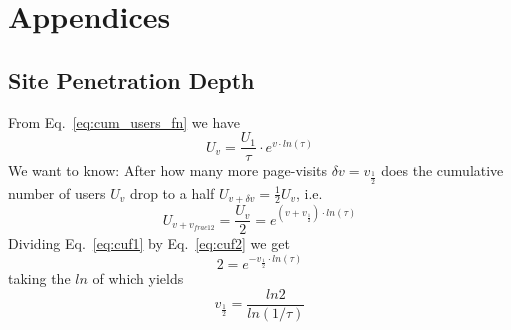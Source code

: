 \documentclass[12pt]{report}
\newcommand{\beq}{\begin{equation}} %
\newcommand{\eeq}{\end{equation}} %
\newcommand{\bdm}{\begin{displaymath}} %
\newcommand{\edm}{\end{displaymath}} %
\begin{document}
\section{Appendices}

\subsection{Site Penetration Depth}\label{sec:penetration_depth}

From Eq.~\ref{eq:cum_users_fn} we have
\beq\label{eq:cuf1}
U_v = \frac{U_1}\tau \cdot e^{v\cdot ln(\tau)}
\eeq
We want to know: After how many more page-visits \(\delta v =
v_{\frac12}\) does the cumulative number of users \(U_v\) drop to a
half \(U_{v+\delta v} = \frac12 U_v\), i.e.
\beq\label{eq:cuf2}
U_{v+v_{frac12}}=\frac{U_v}{2} = e^{(v+v_{\frac12})\cdot ln(\tau)}
\eeq
Dividing Eq.~\ref{eq:cuf1} by Eq.~\ref{eq:cuf2} we get
\bdm
2 = e^{-v_{\frac12}\cdot ln(\tau)}
\edm
taking the \(ln\) of which yields
\bdm
v_{\frac12} = \frac{ln2}{ln(1/\tau)}
\edm
\end{document}
